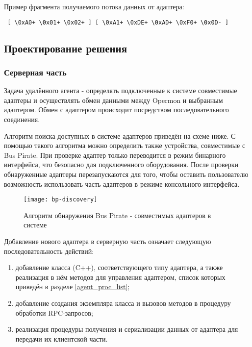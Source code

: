Пример фрагмента получаемого потока данных от адаптера:

\begin{verbatim}
 [ \0xA0+ \0x01+ \0x02+ ] [ \0xA1+ \0xDE+ \0xAD+ \0xF0+ \0x0D- ]
\end{verbatim}

\subsection{Проектирование решения}

\subsubsection{Серверная часть}

Задача удалённого агента - определять подключенные к системе совместимые адаптеры и осуществлять обмен данными между Opermon и выбранным адаптером. Обмен с адаптером происходит посредством последовательного соединения.

Алгоритм поиска доступных в системе адаптеров приведён на схеме ниже. С помощью такого алгоритма можно определить также устройства, совместимые с Bus Pirate. При проверке адаптер только переводится в режим бинарного интерфейса, что безопасно для подключенного оборудования. После проверки обнаруженные адаптеры перезапускаются для того, чтобы оставить пользователю возможность использовать часть адаптеров в режиме консольного интерфейса.

\begin{figure}[H]
 \centering
 \texttt{[image: bp-discovery]}
 \caption{Алгоритм обнаружения Bus Pirate - совместимых адаптеров в системе}
 \label{fig:bp-discovery}
\end{figure}

Добавление нового адаптера в серверную часть означает следующую последовательность действий:

\begin{enumerate}
 \item добавление класса (C++), соответствующего типу адаптера, а также реализация в нём методов для управления адаптером, список которых приведён в разделе \ref{agent_proc_list};
 \item добавление создания экземпляра класса и вызовов методов в процедуру обработки RPC-запросов;
 \item реализация процедуры получения и сериализации данных от адаптера для передачи их клиентской части.
\end{enumerate}

